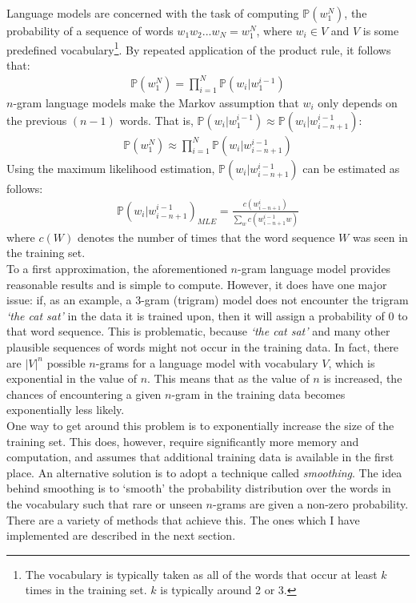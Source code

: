 \documentclass[a4paper, 12pt]{report}
\newcommand{\tit}[1]{\textit{#1}}
\begin{document}
Language models are concerned with the task of computing $\mathbb{P}(w_1^N)$, the probability of a sequence of words $w_1w_2...w_N = w_1^N$, where $w_i \in V$ and $V$ is some predefined vocabulary\footnote{The vocabulary is typically taken as all of the words that occur at least $k$ times in the training set. $k$ is typically around 2 or 3.}. By repeated application of the product rule, it follows that:
\begin{gather*}
	\mathbb{P}(w_1^N) = \prod_{i = 1}^N \mathbb{P}(w_i | w_1^{i - 1})
\end{gather*}
$n$-gram language models make the Markov assumption that $w_i$ only depends on the previous $(n - 1)$ words. That is, $\mathbb{P}(w_i | w_1^{i - 1}) \approx \mathbb{P}(w_i | w_{i - n + 1}^{i - 1})$:
\begin{gather*}
	\mathbb{P}(w_1^N) \approx \prod_{i = 1}^N \mathbb{P}(w_i | w_{i - n + 1}^{i - 1})
\end{gather*}
Using the maximum likelihood estimation, $\mathbb{P}(w_i | w_{i - n + 1}^{i - 1})$ can be estimated as follows:
\begin{gather*}
	\mathbb{P}(w_i | w_{i - n + 1}^{i - 1})_{MLE} = \frac{c(w_{i - n + 1}^{i})}{\sum_w c(w_{i - n + 1}^{i - 1}w)}
\end{gather*}
where $c(W)$ denotes the number of times that the word sequence $W$ was seen in the training set. \\

To a first approximation, the aforementioned $n$-gram language model provides reasonable results and is simple to compute. However, it does have one major issue: if, as an example, a 3-gram (trigram) model does not encounter the trigram \tit{`the cat sat'} in the data it is trained upon, then it will assign a probability of 0 to that word sequence. This is problematic, because \tit{`the cat sat'} and many other plausible sequences of words might not occur in the training data. In fact, there are $|V|^n$ possible $n$-grams for a language model with vocabulary $V$, which is exponential in the value of $n$. This means that as the value of $n$ is increased, the chances of encountering a given $n$-gram in the training data becomes exponentially less likely. \\

One way to get around this problem is to exponentially increase the size of the training set. This does, however, require significantly more memory and computation, and assumes that additional training data is available in the first place. An alternative solution is to adopt a technique called \tit{smoothing}. The idea behind smoothing is to `smooth' the probability distribution over the words in the vocabulary such that rare or unseen $n$-grams are given a non-zero probability. There are a variety of methods that achieve this. The ones which I have implemented are described in the next section. \\
\end{document}
